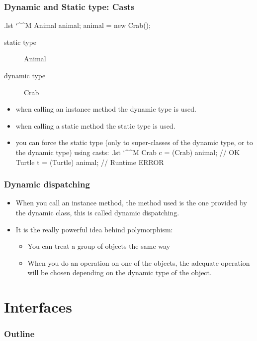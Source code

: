 \documentclass[10pt, handout]{beamer}
\makeatletter
\newenvironment{code}{%
  \begingroup
  \@bsphack
  \immediate\openout\lstvrb@out\jobname.lst
  \let\do\@makeother\dospecials\catcode`\^^M\active
  \def\verbatim@processline{%
    \immediate\write\lstvrb@out{\the\verbatim@line}}%
  \verbatim@start}{%
  \immediate\closeout\lstvrb@out
  \@esphack
  \endgroup
  
  \begin{alertblock}{}
    
  \end{alertblock}}
\makeatother
\begin{document}
\begin{frame}[fragile]
\frametitle{Dynamic and Static type: Casts}
\begin{code}
  Animal animal;
  animal = new Crab();  
\end{code}
\begin{description}
\item[static type] Animal
\item[dynamic type] Crab
\end{description}
\begin{itemize}
  \item when calling an instance method the dynamic type is used.
  \item when calling a static method the static type is used.
  \item you can force the static type (only to super-classes of the dynamic type, or to the dynamic type) using casts:
  \begin{code}
    Crab c = (Crab) animal; // OK
    Turtle t = (Turtle) animal; // Runtime ERROR
  \end{code}
\end{itemize}
\end{frame}

\begin{frame}[fragile]
\frametitle{Dynamic dispatching}
\begin{itemize}
  \item When you call an instance method, the method used is the one provided by the dynamic class,
        this is called \alert{dynamic dispatching}.
  \item It is the really powerful idea behind polymorphism: 
  \begin{itemize}
    \item You can treat a group of objects the same way
    \item When you do an operation on one of the objects, the adequate operation will be chosen depending on the
          dynamic type of the object.
  \end{itemize}
\end{itemize}
\end{frame}
\section{Interfaces}
\begin{frame}
  \frametitle{Outline}
  \tableofcontents[currentsection]
\end{frame}
\end{document}
